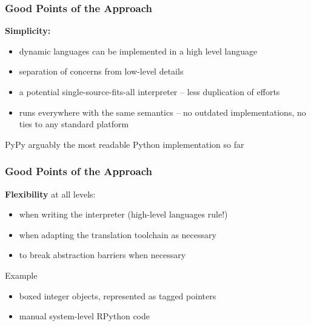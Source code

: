 \documentclass[utf8x]{beamer}
\begin{document}
\begin{frame}
  \frametitle{Good Points of the Approach}
  {\bf Simplicity:}

  \begin{itemize}
  \item
    dynamic languages can be implemented in a high level language
  \item
    separation of concerns from low-level details
  \item
    a potential single-source-fits-all interpreter --
    less duplication of efforts
  \item
    runs everywhere with the same semantics --
    no outdated implementations, no ties to any standard platform
  \end{itemize}
  \pause
  \begin{block}{PyPy}
     arguably the most readable Python implementation so far
  \end{block}
\end{frame}

\begin{frame}
  \frametitle{Good Points of the Approach}
  {\bf Flexibility} at all levels:

  \begin{itemize}
  \item
    when writing the interpreter (high-level languages rule!)
  \item
    when adapting the translation toolchain as necessary
  \item
    to break abstraction barriers when necessary
  \end{itemize}
  \pause
  \begin{block}{
    Example}
    \begin{itemize}
    \item
      boxed integer objects, represented as tagged pointers
    \item
      manual system-level RPython code
    \end{itemize}
  \end{block}
\end{frame}
\end{document}
